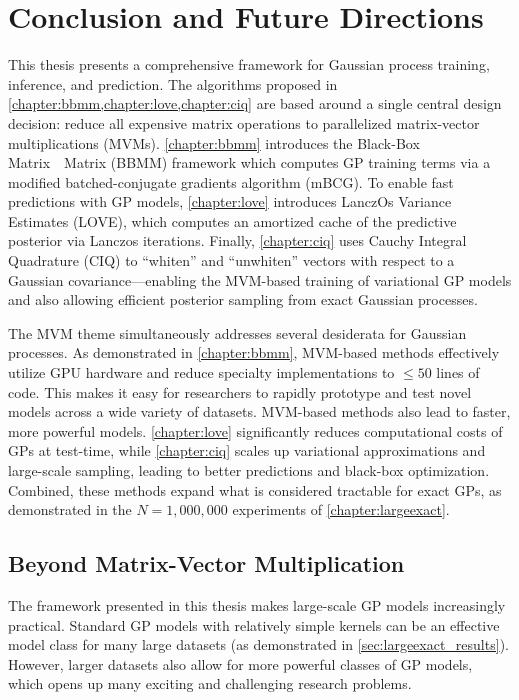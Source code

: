 \chapter{Conclusion and Future Directions}
\label{chapter:discussion}


This thesis presents a comprehensive framework for Gaussian process training, inference, and prediction.
The algorithms proposed in \cref{chapter:bbmm,chapter:love,chapter:ciq} are based around a single central design decision: reduce all expensive matrix operations to parallelized matrix-vector multiplications (MVMs).
\cref{chapter:bbmm} introduces the Black-Box Matrix~\texttimes~Matrix (BBMM) framework which computes GP training terms via a modified batched-conjugate gradients algorithm (mBCG).
To enable fast predictions with GP models, \cref{chapter:love} introduces LanczOs Variance Estimates (LOVE), which computes an amortized cache of the predictive posterior via Lanczos iterations.
Finally, \cref{chapter:ciq} uses Cauchy Integral Quadrature (CIQ) to ``whiten'' and ``unwhiten'' vectors with respect to a Gaussian covariance---enabling
the MVM-based training of variational GP models and also allowing efficient posterior sampling from exact Gaussian processes.

The MVM theme simultaneously addresses several desiderata for Gaussian processes.
As demonstrated in \cref{chapter:bbmm}, MVM-based methods effectively utilize GPU hardware and reduce specialty implementations to $\leq 50$ lines of code.
This makes it easy for researchers to rapidly prototype and test novel models across a wide variety of datasets.
MVM-based methods also lead to faster, more powerful models.
\cref{chapter:love} significantly reduces computational costs of GPs at test-time, while
\cref{chapter:ciq} scales up variational approximations and large-scale sampling, leading to better predictions and black-box optimization.
Combined, these methods expand what is considered tractable for exact GPs, as demonstrated in the $N=1,\!000,\!000$ experiments of \cref{chapter:largeexact}.
\clearpage



\section{Beyond Matrix-Vector Multiplication}

The framework presented in this thesis makes large-scale GP models increasingly practical.
Standard GP models with relatively simple kernels can be an effective model class for many large datasets (as demonstrated in \cref{sec:largeexact_results}).
However, larger datasets also allow for more powerful classes of GP models, which opens up many exciting and challenging research problems.

